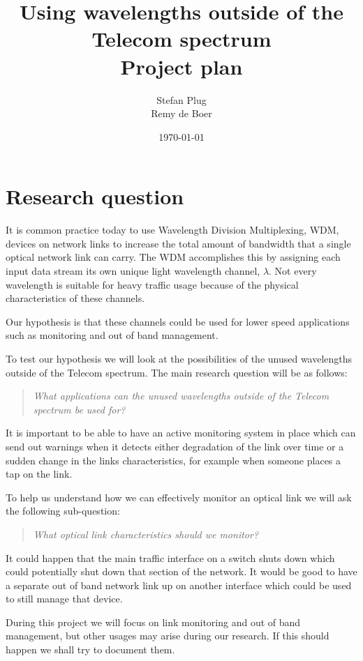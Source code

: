 \documentclass{article}
\begin{document}
\title{Using wavelengths outside of the Telecom spectrum\\Project plan}
\author{Stefan Plug\\Remy de Boer}
\date{\today}
\maketitle

\section{Research question}
It is common practice today to use Wavelength Division Multiplexing, WDM, devices on network links to increase the total amount of bandwidth that a single optical network link can carry. The WDM accomplishes this by assigning each input data stream its own unique light wavelength channel, $\lambda$. 
Not every wavelength is suitable for heavy traffic usage because of the physical characteristics of these channels. 

Our hypothesis is that these channels could be used for lower speed applications such as monitoring and out of band management.

To test our hypothesis we will look at the possibilities of the unused wavelengths outside of the Telecom spectrum.
The main research question will be as follows:
\begin{quote}
\textit{
What applications can the unused wavelengths outside of the Telecom spectrum be used for?
}
\end{quote}

It is important to be able to have an active monitoring system in place which can send out warnings when it detects either degradation of the link over time or a sudden change in the links characteristics, for example when someone places a tap on the link. 

To help us understand how we can effectively monitor an optical link we will ask the following sub-question:
\begin{quote}
\textit{
What optical link characteristics should we monitor?
}
\end{quote}

It could happen that the main traffic interface on a switch shuts down which could potentially shut down that section of the network.
It would be good to have a separate out of band network link up on another interface which could be used to still manage that device.

During this project we will focus on link monitoring and out of band management, but other usages may arise during our research.
If this should happen we shall try to document them.
\end{document}

